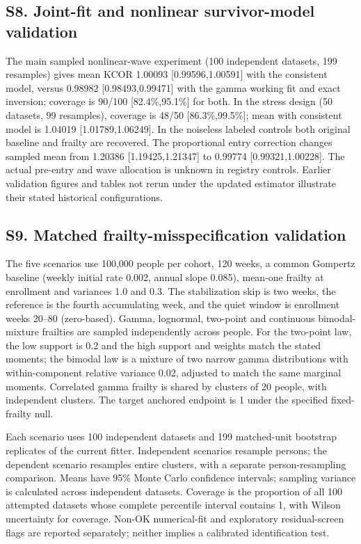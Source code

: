 \documentclass[
]{article}
\begin{document}
\subsection{S8. Joint-fit and nonlinear survivor-model validation}\label{s8.-joint-fit-and-nonlinear-survivor-model-validation}

The main sampled nonlinear-wave experiment (100 independent datasets, 199 resamples) gives mean KCOR 1.00093 {[}0.99596,1.00591{]} with the consistent model, versus 0.98982 {[}0.98493,0.99471{]} with the gamma working fit and exact inversion; coverage is 90/100 {[}82.4\%,95.1\%{]} for both. In the stress design (50 datasets, 99 resamples), coverage is 48/50 {[}86.3\%,99.5\%{]}; mean with consistent model is 1.04019 {[}1.01789,1.06249{]}. In the noiseless labeled controls both original baseline and frailty are recovered. The proportional entry correction changes sampled mean from 1.20386 {[}1.19425,1.21347{]} to 0.99774 {[}0.99321,1.00228{]}. The actual pre-entry and wave allocation is unknown in registry controls. Earlier validation figures and tables not rerun under the updated estimator illustrate their stated historical configurations.

\subsection{S9. Matched frailty-misspecification validation}\label{s9.-matched-frailty-misspecification-validation}

The five scenarios use 100,000 people per cohort, 120 weeks, a common Gompertz baseline (weekly initial rate 0.002, annual slope 0.085), mean-one frailty at enrollment and variances 1.0 and 0.3. The stabilization skip is two weeks, the reference is the fourth accumulating week, and the quiet window is enrollment weeks 20--80 (zero-based). Gamma, lognormal, two-point and continuous bimodal-mixture frailties are sampled independently across people. For the two-point law, the low support is 0.2 and the high support and weights match the stated moments; the bimodal law is a mixture of two narrow gamma distributions with within-component relative variance 0.02, adjusted to match the same marginal moments. Correlated gamma frailty is shared by clusters of 20 people, with independent clusters. The target anchored endpoint is 1 under the specified fixed-frailty null.

Each scenario uses 100 independent datasets and 199 matched-unit bootstrap replicates of the current fitter. Independent scenarios resample persons; the dependent scenario resamples entire clusters, with a separate person-resampling comparison. Means have 95\% Monte Carlo confidence intervals; sampling variance is calculated across independent datasets. Coverage is the proportion of all 100 attempted datasets whose complete percentile interval contains 1, with Wilson uncertainty for coverage. Non-OK numerical-fit and exploratory residual-screen flags are reported separately; neither implies a calibrated identification test.
\end{document}
